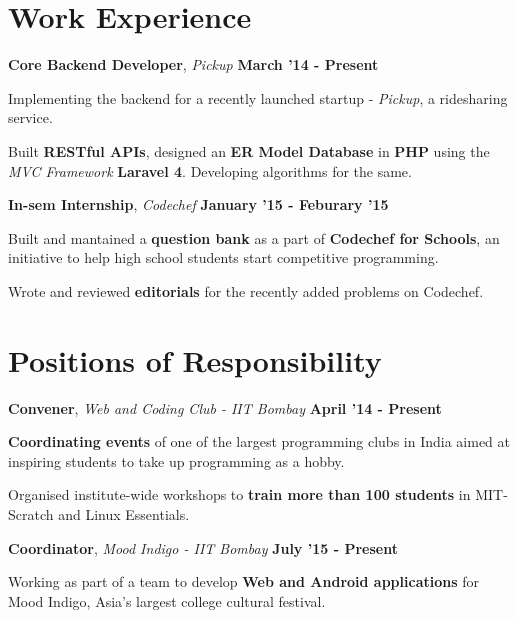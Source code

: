 \documentclass[11pt]{resume}
\begin{document}
\begin{resume}
\section{\mysidestyle Work Experience}
\textbf{Core Backend Developer}, \textsl{Pickup} \hfill \textbf{March '14 - Present}

\begin{list2}
\item Implementing the backend for a recently launched startup - \textit {Pickup}, a ridesharing service.
\item Built \textbf {RESTful APIs}, designed an \textbf {ER Model Database} in \textbf {PHP} using the \textit {MVC Framework} \textbf{Laravel 4}. Developing algorithms for the same.
\end{list2}

\textbf{In-sem Internship}, \textsl{Codechef} \hfill \textbf{January '15 - Feburary '15}\\
\vspace{-4mm}
\begin{list2}
\item Built and mantained a \textbf{question bank} as a part of \textbf {Codechef for Schools}, an initiative to help high school students start competitive programming.
\item Wrote and reviewed \textbf{editorials} for the recently added problems on Codechef.
\end{list2}

\section{\mysidestyle Positions of Responsibility}
\textbf{Convener}, \textit{Web and Coding Club - IIT Bombay} \hfill \textbf{April '14 - Present}\\

\vspace{-4mm}
\begin{list2}
\item \textbf{Coordinating events} of one of the largest programming clubs in India aimed at inspiring students to take up programming as a hobby.
\item Organised institute-wide workshops to \textbf{train more than 100 students} in MIT-Scratch and Linux Essentials.
\end{list2}

\textbf{Coordinator}, \textit{Mood Indigo - IIT Bombay} \hfill \textbf{July '15 - Present}\\
\vspace{-4mm}
\begin{list2}
\item Working as part of a team to develop \textbf{Web and Android applications} for Mood Indigo, Asia's largest college cultural festival. 
\end{list2}




\end{resume}
\end{document}
